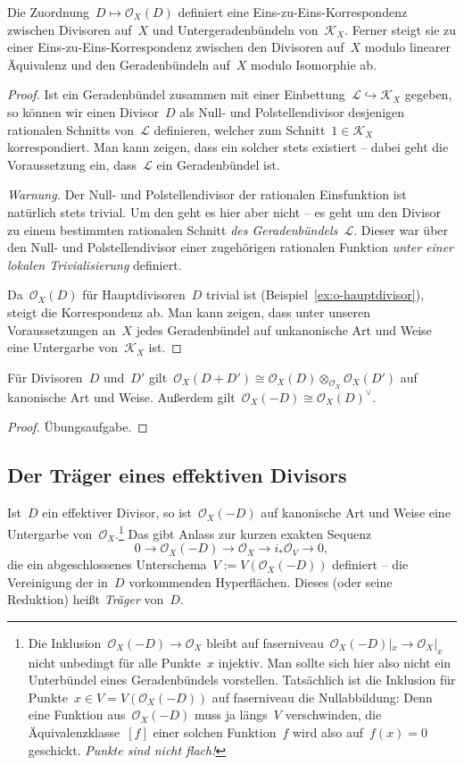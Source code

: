 \documentclass[a4paper,ngerman,12pt]{scrartcl}
\theoremstyle{definition}
\theoremstyle{plain}
\theoremstyle{remark}
\newcommand{\K}{\mathcal{K}}
\renewcommand{\L}{\mathcal{L}}
\renewcommand{\O}{\mathcal{O}}
\newcommand{\lra}{\longrightarrow}
\begin{document}
\begin{prop}\label{prop:div-pic}Die Zuordnung~$D \mapsto \O_X(D)$ definiert eine
Eins-zu-Eins-Korres\-pon\-denz zwischen Divisoren auf~$X$ und Untergeradenbündeln
von~$\K_X$. Ferner steigt sie zu einer Eins-zu-Eins-Korrespondenz zwischen
den Divisoren auf~$X$ modulo linearer Äquivalenz und den Geradenbündeln
auf~$X$ modulo Isomorphie ab.
\end{prop}
\begin{proof}Ist ein Geradenbündel zusammen mit einer Einbettung~$\L
\hookrightarrow \K_X$ gegeben, so können wir einen Divisor~$D$ als Null- und
Polstellendivisor desjenigen rationalen Schnitts von~$\L$ definieren, welcher
zum Schnitt~$1 \in \K_X$ korrespondiert. Man kann zeigen, dass ein
solcher stets existiert -- dabei geht die Voraussetzung ein, dass~$\L$ ein
Geradenbündel ist.

\emph{Warnung.} Der Null- und Polstellendivisor der rationalen Einsfunktion ist
natürlich stets trivial. Um den geht es hier aber nicht -- es geht um den
Divisor zu einem bestimmten rationalen Schnitt \emph{des Geradenbündels~$\L$}. Dieser war
über den Null- und Polstellendivisor einer zugehörigen rationalen Funktion
\emph{unter einer lokalen Trivialisierung} definiert.

Da~$\O_X(D)$ für Hauptdivisoren~$D$ trivial ist
(Beispiel~\ref{ex:o-hauptdivisor}), steigt die Korrespondenz ab. Man kann
zeigen, dass unter unseren Voraussetzungen an~$X$ jedes Geradenbündel auf
unkanonische Art und Weise eine Untergarbe von~$\K_X$ ist.
\end{proof}

\begin{lemma}Für Divisoren~$D$ und~$D'$ gilt~$\O_X(D + D') \cong \O_X(D)
\otimes_{\O_X} \O_X(D')$ auf kanonische Art und Weise. Außerdem gilt~$\O_X(-D)
\cong \O_X(D)^\vee$.\end{lemma}
\begin{proof}Übungsaufgabe.
\end{proof}


\subsection*{Der Träger eines effektiven Divisors}

Ist~$D$ ein effektiver Divisor, so ist~$\O_X(-D)$ auf kanonische Art
und Weise eine Untergarbe von~$\O_X$.\footnote{Die Inklusion~$\O_X(-D) \to
\O_X$ bleibt auf faserniveau~$\O_X(-D)|_x \to \O_X|_x$ nicht unbedingt für alle
Punkte~$x$ injektiv. Man sollte sich hier also nicht ein Unterbündel eines 
Geradenbündels vorstellen. Tatsächlich ist die Inklusion für Punkte~$x \in V = V(\O_X(-D))$
auf faserniveau die Nullabbildung: Denn eine Funktion aus~$\O_X(-D)$ muss ja längs~$V$
verschwinden, die Äquivalenzklasse~$[f]$ einer solchen Funktion~$f$ wird also
auf~$f(x) = 0$ geschickt. \emph{Punkte sind nicht flach!}}
Das gibt Anlass zur kurzen exakten Sequenz
\[ 0 \lra \O_X(-D) \lra \O_X \lra i_*\O_V \lra 0, \]
die ein abgeschlossenes Unterschema~$V := V(\O_X(-D))$ definiert -- die Vereinigung
der in~$D$ vorkommenden Hyperflächen. Dieses (oder seine Reduktion) heißt
\emph{Träger} von~$D$.
\end{document}
